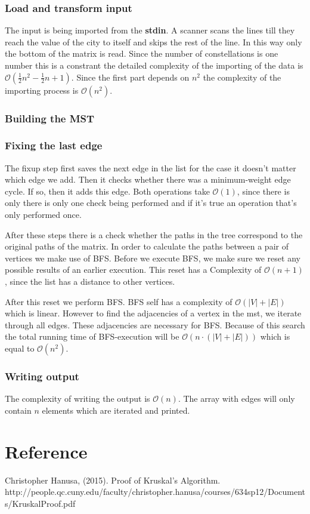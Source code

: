 \documentclass{article}
\newcommand{\bigO}[1]{\mathcal{O}(#1)}
\begin{document}
\subsubsection{Load and transform input}
The input is being imported from the \textbf{stdin}. A scanner scans the lines till they reach the value of the city to itself and skips the rest of the line. In this way only the bottom of the matrix is read. Since the number of constellations is one number this is a constrant the detailed complexity of the importing of the data is $\bigO{\frac{1}{2}n^2 - \frac{1}{2}n + 1}$. Since the first part depends on $n^2$ the complexity of the importing process is $\bigO{n^2}$.

\subsubsection{Building the MST}

\subsubsection{Fixing the last edge}
The fixup step first saves the next edge in the list for the case it doesn't matter which edge we add. Then it checks whether there was a minimum-weight edge cycle. If so, then it adds this edge. Both operations take $\bigO{1}$, since there is only there is only one check being performed and if it's true an operation that's only performed once.

After these steps there is a check whether the paths in the tree correspond to the original paths of the matrix. In order to calculate the paths between a pair of vertices we make use of BFS. Before we execute BFS, we make sure we reset any possible results of an earlier execution. This reset has a Complexity of $\bigO{n + 1}$, since the list has a distance to other vertices.

After this reset we perform BFS. BFS self has a complexity of $\bigO{|V| + |E|}$ which is linear. However to find the adjacencies of a vertex in the mst, we iterate through all edges. These adjacencies are necessary for BFS. Because of this search the total running time of BFS-execution will be $\bigO{n \cdot (|V| + |E|)}$ which is equal to $\bigO{n^2}$.

\subsubsection{Writing output}
The complexity of writing the output is $\bigO{n}$. The array with edges will only contain $n$ elements which are iterated and printed.

\section{Reference}

Christopher Hanusa, (2015). Proof of Kruskal’s Algorithm. \newline
http://people.qc.cuny.edu/faculty/christopher.hanusa/courses/634sp12/Documents/KruskalProof.pdf
\end{document}
